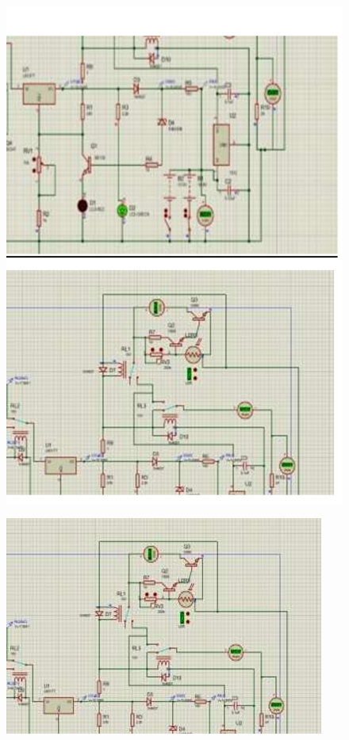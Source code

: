 \documentclass[twocolumn]{article}
\begin{document}
\begin{figure}[h]
    \centering
    \includegraphics{12.png}
    \label{fig:enter-label}
\end{figure}

\begin{figure}[h]
    \centering
    \includegraphics{13.png}
    \label{fig:enter-label}
\end{figure}
\end{document}
